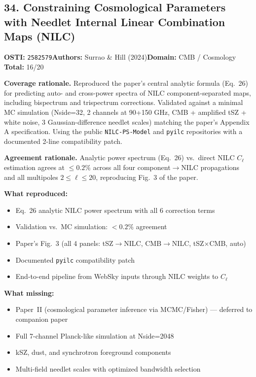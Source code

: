 \subsection{34. Constraining Cosmological Parameters with Needlet Internal Linear Combination Maps (NILC)}
\textbf{OSTI:} \texttt{2582579}\quad\textbf{Authors:} Surrao \& Hill (2024)\quad\textbf{Domain:} CMB / Cosmology\\
\quad{}\quad\textbf{Total:} 16/20\par\smallskip
\noindent\textbf{Coverage rationale.} Reproduced the paper's central analytic formula (Eq.~26) for predicting auto- and cross-power spectra of NILC component-separated maps, including bispectrum and trispectrum corrections. Validated against a minimal MC simulation (Nside=32, 2 channels at 90+150 GHz, CMB + amplified tSZ + white noise, 3 Gaussian-difference needlet scales) matching the paper's Appendix A specification. Using the public \texttt{NILC-PS-Model} and \texttt{pyilc} repositories with a documented 2-line compatibility patch.\par
\noindent\textbf{Agreement rationale.} Analytic power spectrum (Eq.~26) vs.\ direct NILC $C_\ell$ estimation agrees at $\leq 0.2\%$ across all four component$\rightarrow$NILC propagations and all multipoles $2\leq\ell\leq 20$, reproducing Fig.~3 of the paper.\par\smallskip
\noindent\textbf{What reproduced:}
\begin{itemize}[leftmargin=1.4em,itemsep=0.2em,topsep=0.2em]
\item Eq.~26 analytic NILC power spectrum with all 6 correction terms
\item Validation vs.\ MC simulation: $<0.2\%$ agreement
\item Paper's Fig.~3 (all 4 panels: tSZ$\rightarrow$NILC, CMB$\rightarrow$NILC, tSZ$\times$CMB, auto)
\item Documented \texttt{pyilc} compatibility patch
\item End-to-end pipeline from WebSky inputs through NILC weights to $C_\ell$
\end{itemize}
\noindent\textbf{What missing:}
\begin{itemize}[leftmargin=1.4em,itemsep=0.2em,topsep=0.2em]
\item Paper~II (cosmological parameter inference via MCMC/Fisher) --- deferred to companion paper
\item Full 7-channel Planck-like simulation at Nside=2048
\item kSZ, dust, and synchrotron foreground components
\item Multi-field needlet scales with optimized bandwidth selection
\end{itemize}
